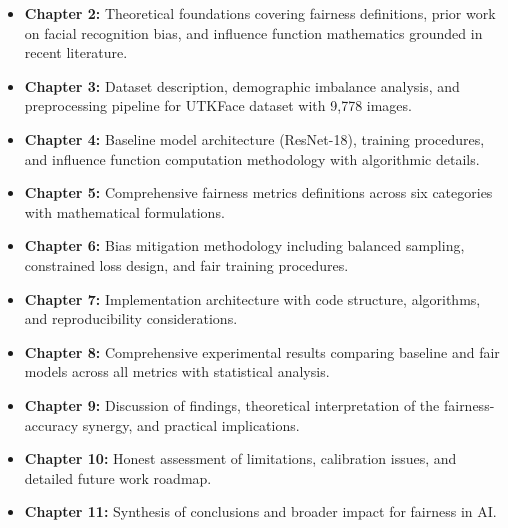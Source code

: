 \documentclass[11pt,a4paper,oneside]{report}
\begin{document}
\begin{itemize}

\item \textbf{Chapter 2:} Theoretical foundations covering fairness definitions, prior work on facial recognition bias, and influence function mathematics grounded in recent literature.

\item \textbf{Chapter 3:} Dataset description, demographic imbalance analysis, and preprocessing pipeline for UTKFace dataset with 9,778 images.

\item \textbf{Chapter 4:} Baseline model architecture (ResNet-18), training procedures, and influence function computation methodology with algorithmic details.

\item \textbf{Chapter 5:} Comprehensive fairness metrics definitions across six categories with mathematical formulations.

\item \textbf{Chapter 6:} Bias mitigation methodology including balanced sampling, constrained loss design, and fair training procedures.

\item \textbf{Chapter 7:} Implementation architecture with code structure, algorithms, and reproducibility considerations.

\item \textbf{Chapter 8:} Comprehensive experimental results comparing baseline and fair models across all metrics with statistical analysis.

\item \textbf{Chapter 9:} Discussion of findings, theoretical interpretation of the fairness-accuracy synergy, and practical implications.

\item \textbf{Chapter 10:} Honest assessment of limitations, calibration issues, and detailed future work roadmap.

\item \textbf{Chapter 11:} Synthesis of conclusions and broader impact for fairness in AI.

\end{itemize}

\end{document}
